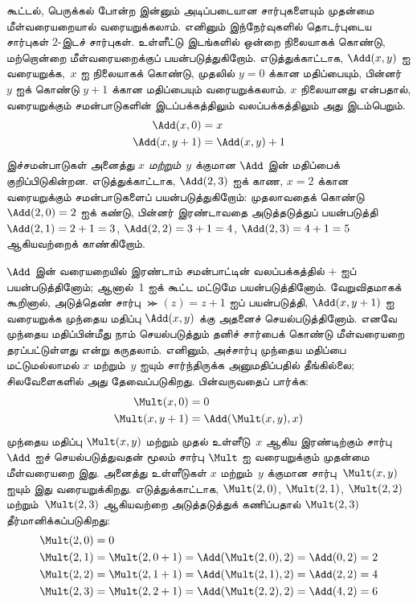 \documentclass[../../../include/open-logic-section]{subfiles}
\begin{document}
கூட்டல், பெருக்கல் போன்ற இன்னும் அடிப்படையான சார்புகளையும் முதன்மை
மீள்வரையறையால் வரையறுக்கலாம். எனினும் இந்நேர்வுகளில் தொடர்புடைய
சார்புகள் $2$-இடச் சார்புகள். உள்ளீட்டு இடங்களில் ஒன்றை நிலையாகக்
கொண்டு, மற்றொன்றை மீள்வரையறைக்குப் பயன்படுத்துகிறோம். எடுத்துக்காட்டாக,
$\Add(x, y)$ ஐ வரையறுக்க,~$x$ ஐ நிலையாகக் கொண்டு, முதலில்
$y=0$ க்கான மதிப்பையும், பின்னர்~$y$ ஐக் கொண்டு $y+1$ க்கான
மதிப்பையும் வரையறுக்கலாம். $x$ நிலையானது என்பதால், வரையறுக்கும்
சமன்பாடுகளின் இடப்பக்கத்திலும் வலப்பக்கத்திலும் அது இடம்பெறும்.
\begin{align*}
\Add(x,0) & =  x\\
\Add(x,y+1) & =  \Add(x,y)+1
\end{align*}
இச்சமன்பாடுகள் அனைத்து $x$ \emph{மற்றும்}~$y$ க்குமான
$\Add$ இன் மதிப்பைக் குறிப்பிடுகின்றன. எடுத்துக்காட்டாக,
$\Add(2,3)$ ஐக் காண, $x = 2$ க்கான வரையறுக்கும் சமன்பாடுகளைப்
பயன்படுத்துகிறோம்: முதலாவதைக் கொண்டு $\Add(2,0) = 2$ ஐக் கண்டு,
பின்னர் இரண்டாவதை அடுத்தடுத்துப் பயன்படுத்தி
$\Add(2,1) = 2 + 1 = 3$, $\Add(2, 2) = 3 + 1 = 4$, $\Add(2,
3) = 4 + 1 = 5$ ஆகியவற்றைக் காண்கிறோம்.

$\Add$ இன் வரையறையில் இரண்டாம் சமன்பாட்டின் வலப்பக்கத்தில்
$+$ ஐப் பயன்படுத்தினோம்; ஆனால்~$1$ ஐக் கூட்ட மட்டுமே பயன்படுத்தினோம்.
வேறுவிதமாகக் கூறினால், அடுத்தெண் சார்பு $\Succ(z) = z+1$ ஐப்
பயன்படுத்தி, $\Add(x,y+1)$ ஐ வரையறுக்க முந்தைய மதிப்பு
$\Add(x,y)$ க்கு அதனைச் செயல்படுத்தினோம். எனவே முந்தைய மதிப்பின்மீது
நாம் செயல்படுத்தும் தனிச் சார்பைக் கொண்டு மீள்வரையறை தரப்பட்டுள்ளது
என்று கருதலாம். எனினும், அச்சார்பு முந்தைய மதிப்பை மட்டுமல்லாமல்
$x$ மற்றும்~$y$ ஐயும் சார்ந்திருக்க அனுமதிப்பதில் தீங்கில்லை;
சிலவேளைகளில் அது தேவைப்படுகிறது. பின்வருவதைப் பார்க்க:
\begin{align*}
  \Mult(x,0) & =  0 \\
  \Mult(x,y+1) & =  \Add(\Mult(x,y),x)
\end{align*}
முந்தைய மதிப்பு $\Mult(x,y)$ மற்றும் முதல் உள்ளீடு~$x$ ஆகிய
இரண்டிற்கும் சார்பு $\Add$ ஐச் செயல்படுத்துவதன் மூலம்
சார்பு $\Mult$ ஐ வரையறுக்கும் முதன்மை மீள்வரையறை இது.
அனைத்து உள்ளீடுகள் $x$ மற்றும்~$y$ க்குமான
சார்பு~$\Mult(x,y)$ ஐயும் இது வரையறுக்கிறது. எடுத்துக்காட்டாக,
$\Mult(2,0)$, $\Mult(2,1)$, $\Mult(2,2)$ மற்றும்~$\Mult(2,3)$
ஆகியவற்றை அடுத்தடுத்துக் கணிப்பதால் $\Mult(2,3)$ தீர்மானிக்கப்படுகிறது:
\begin{align*}
  \Mult(2,0) & = 0\\
  \Mult(2,1) & = \Mult(2,0+1) =
  \Add(\Mult(2,0), 2) = \Add(0, 2) = 2\\
  \Mult(2,2) & = \Mult(2,1+1) =
  \Add(\Mult(2,1), 2) = \Add(2, 2) = 4\\
  \Mult(2,3) & = \Mult(2,2+1) =
  \Add(\Mult(2,2), 2) = \Add(4, 2) = 6
\end{align*}
\end{document}
